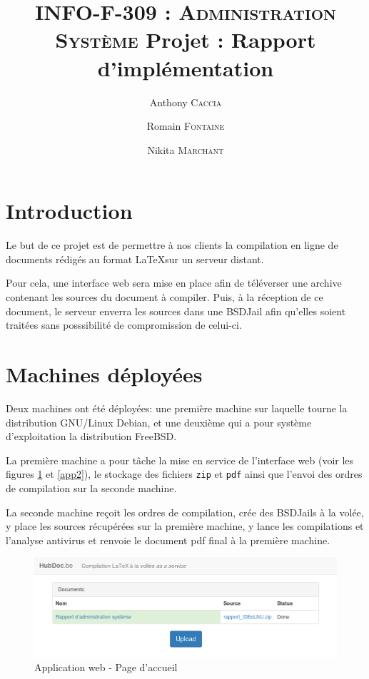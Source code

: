 \documentclass[10pt,a4paper]{article}
\author{Anthony \textsc{Caccia} \and Romain \textsc{Fontaine} \and Nikita \textsc{Marchant} }
\date{}
\title{\textsc{INFO-F-309 : Administration Système} Projet : Rapport d'implémentation}
\begin{document}
\maketitle

\tableofcontents
\newpage

\section{Introduction}
\label{sec:Introduction}

Le but de ce projet est de permettre à nos clients la compilation en ligne de documents rédigés au format \LaTeX sur un serveur distant.

Pour cela, une interface web sera mise en place afin de téléverser une archive contenant les sources du document à compiler.
Puis, à la réception de ce document, le serveur enverra les sources dans une BSDJail afin qu'elles soient traitées sans posssibilité de compromission de celui-ci.

\section{Machines déployées}
\label{sec:Machines déployées}

Deux machines ont été déployées: une première machine sur laquelle tourne la distribution GNU/Linux Debian, et une deuxième qui a pour système d'exploitation la distribution FreeBSD.

La première machine a pour tâche la mise en service de l'interface web
(voir les figures \ref{app1} et \ref{app2}),
le stockage des fichiers \texttt{zip} et \texttt{pdf}
ainsi que l'envoi des ordres de compilation sur la seconde machine.

La seconde machine reçoit les ordres de compilation, crée des BSDJails à la volée, y place les sources récupérées sur la première machine,
y lance les compilations et l'analyse antivirus et renvoie le document pdf final à la première machine.

\begin{figure}[h]
   \includegraphics[scale=0.4]{hubdoc.png}
   \caption{\label{app1} Application web - Page d'accueil}
\end{figure}
\end{document}
